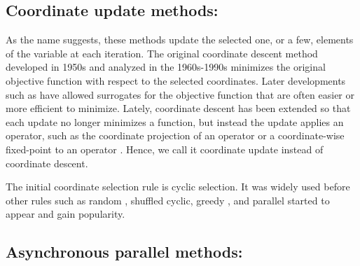 \subsection*{Coordinate update methods:}
As the name suggests, these methods update the selected one, or a few, elements of the variable at each iteration. The original  coordinate descent method \citep{Hildreth1957_quadratic,Warga1963_minimizing,SargentSebastian1973_convergence,LuoTseng1992_convergence} developed in 1950s and analyzed in the 1960s-1990s minimizes the original objective function with respect to the selected coordinates. Later developments such as \citep{GrippoSciandrone2000_convergence,TsengYun2009_coordinate,TsengYun2009_blockcoordinate,XuYin2013_block,BolteSabachTeboulle2014_proximal} have allowed surrogates for the objective function that are often easier or more efficient to minimize. Lately, coordinate descent has been extended so that each update no longer minimizes a function, but instead the update applies an operator, such as the coordinate projection of an operator or a coordinate-wise fixed-point to an operator \citep{CombettesPesquet2015_stochastic,BianchiHachemFranck2014_stochastic,PengXuYanYin2015_arock,PengWuXuYanYin2016_coordinate}. Hence, we call it coordinate update instead of coordinate descent.

The initial coordinate selection rule  is cyclic selection. It was widely used before other rules such as random \citep{Nesterov2012_efficiency,RichtarikTakac2014_iteration,LuXiao2015_complexity}, shuffled cyclic, greedy \citep{BertsekasBertsekas1999_nonlinear,LiOsher2009_coordinate,TsengYun2009_coordinate,PengYanYin2013_parallel,NutiniSchmidtLaradjiFriedlanderKoepke2015_coordinate}, and parallel \citep{BradleyKyrolaBicksonGuestrin2011_parallel,richtarik2016parallel} started to appear and gain popularity.


\subsection*{Asynchronous parallel methods:}

